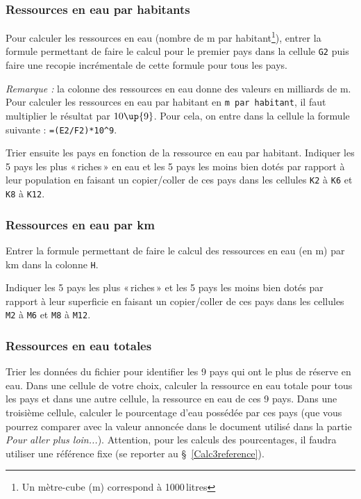 \subsubsection{Ressources en eau par habitants}

Pour calculer les ressources en eau (nombre de m par habitant\footnote{Un mètre-cube (m) correspond à 1000\,litres}), entrer la formule permettant de faire le calcul pour le premier pays dans la cellule \texttt{G2} puis faire une recopie incrémentale de cette formule pour tous les pays.

\emph{Remarque :} la colonne des ressources en eau donne des valeurs en milliards de m. Pour calculer les ressources en eau par habitant en \texttt{m par habitant}, il faut multiplier le résultat par $10\up{9}$. Pour cela, on entre dans la cellule la formule suivante : \texttt{=(E2/F2)*10}\texttt{\^}\texttt{9}.

Trier ensuite les pays en fonction de la ressource en eau par habitant. Indiquer les 5 pays les plus «\,riches\,» en eau et les 5 pays les moins bien dotés par rapport à leur population en faisant un copier/coller de ces pays dans les cellules \texttt{K2} à \texttt{K6} et \texttt{K8} à \texttt{K12}.

\subsubsection{Ressources en eau par km}

Entrer la formule permettant de faire le calcul des ressources en eau (en m) par km dans la colonne \texttt{H}.

Indiquer les 5 pays les plus «\,riches\,» et les 5 pays les moins bien dotés par rapport à leur superficie en faisant un copier/coller de ces pays dans les cellules \texttt{M2} à \texttt{M6} et \texttt{M8} à \texttt{M12}.


\subsubsection{Ressources en eau totales}

\vspace{12pt}

Trier les données du fichier pour identifier les 9 pays qui ont le plus de réserve en eau. Dans une cellule de votre choix, calculer la ressource en eau totale pour tous les pays et dans une autre cellule, la ressource en eau de ces 9 pays. Dans une troisième cellule, calculer le pourcentage d'eau possédée par ces pays (que vous pourrez comparer avec la valeur annoncée dans le document utilisé dans la partie \emph{Pour aller plus loin...}). Attention, pour les calculs des pourcentages, il faudra utiliser une référence fixe (se reporter au \S\ \vref{Calc3reference}).

